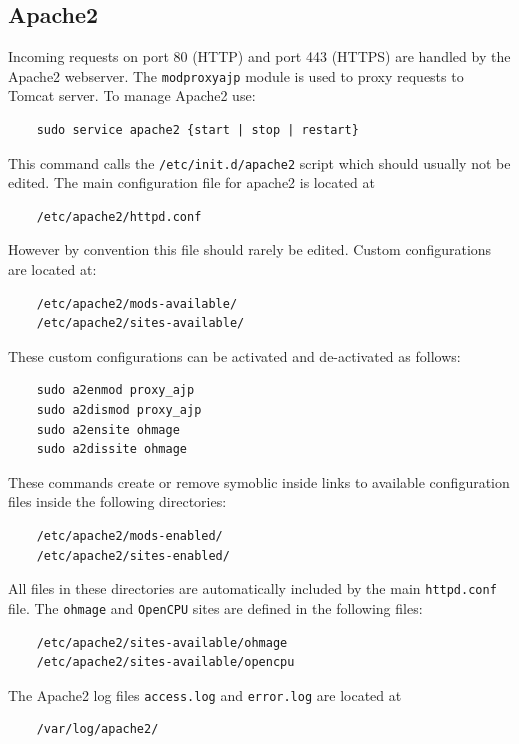 \documentclass{scrartcl}
\begin{document}
\subsection{Apache2}

Incoming requests on port 80 (HTTP) and port 443 (HTTPS) are handled by the
Apache2 webserver. The \texttt{mod\textunderscore proxy\textunderscore ajp}
module is used to proxy requests to Tomcat server. To manage Apache2 use:

\begin{verbatim}
    sudo service apache2 {start | stop | restart}
\end{verbatim}
This command calls the \texttt{/etc/init.d/apache2} script which should usually not be edited. The main configuration file for apache2 is located at

\begin{verbatim}
    /etc/apache2/httpd.conf
\end{verbatim}
However by convention this file should rarely be edited. Custom configurations
are located at:

\begin{verbatim}
    /etc/apache2/mods-available/
    /etc/apache2/sites-available/
\end{verbatim}
These custom configurations can be activated and de-activated as follows:

\begin{verbatim}
    sudo a2enmod proxy_ajp
    sudo a2dismod proxy_ajp
    sudo a2ensite ohmage
    sudo a2dissite ohmage
\end{verbatim}
These commands create or remove symoblic inside links to available configuration
files inside the following directories:

\begin{verbatim}
    /etc/apache2/mods-enabled/
    /etc/apache2/sites-enabled/
\end{verbatim}
All files in these directories are automatically included by the main
\texttt{httpd.conf} file. The \texttt{ohmage} and \texttt{OpenCPU} sites are
defined in the following files:

\begin{verbatim}
    /etc/apache2/sites-available/ohmage
    /etc/apache2/sites-available/opencpu
\end{verbatim}
The Apache2 log files \texttt{access.log} and \texttt{error.log} are located at

\begin{verbatim}
    /var/log/apache2/
\end{verbatim}
\end{document}
